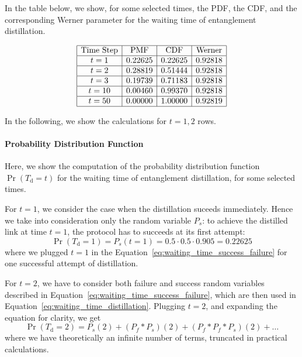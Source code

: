 \documentclass{masterthesis}
\begin{document}
In the table below, we show, for some selected times, the PDF, the CDF, and the corresponding Werner parameter for the waiting time of entanglement distillation.

\begin{equation*}
    \begin{array}{|c|c|c|c|}
        \hline
        \text{Time Step} & \text{PMF} & \text{CDF} & \text{Werner} \\
        \hline
        t = 1 & 0.22625 & 0.22625 & 0.92818 \\
        \hline
        t = 2 & 0.28819 & 0.51444 & 0.92818 \\
        \hline
        t = 3 & 0.19739 & 0.71183 & 0.92818 \\
        \hline
        t = 10 & 0.00460 & 0.99370 & 0.92818 \\
        \hline
        t = 50 & 0.00000 & 1.00000 & 0.92819 \\
        \hline
    \end{array}
\end{equation*}

In the following, we show the calculations for $t={1,2}$ rows.

\paragraph*{Probability Distribution Function}

Here, we show the computation of the probability distribution function $\Pr(T_{\text{d}} = t)$ for the waiting time of entanglement distillation, for some selected times.

For $t = 1$, we consider the case when the distillation suceeds immediately. Hence we take into consideration only the random variable $P_s$: to achieve the distilled link at time $t=1$, the protocol has to succeeds at its first attempt: 
\begin{equation}
    \Pr(T_{\text{d}} = 1) = P_s(t = 1) = 0.5 \cdot 0.5 \cdot 0.905 = 0.22625
\end{equation}
where we plugged $t = 1$ in the Equation~\ref{eq:waiting_time_success_failure} for one successful attempt of distillation.

For $t = 2$, we have to consider both failure and success random variables described in Equation~\ref{eq:waiting_time_success_failure}, which are then used in Equation~\ref{eq:waiting_time_distillation}. Plugging $t=2$, and expanding the equation for clarity, we get 
\begin{equation}\label{eq:distillation_t2}
    \Pr(T_{\text{d}} = 2) = P_s(2) + (P_f \ast P_s)(2) + (P_f \ast P_f \ast P_s)(2) + \ldots
\end{equation}
where we have theoretically an infinite number of terms, truncated in practical calculations.
\end{document}
